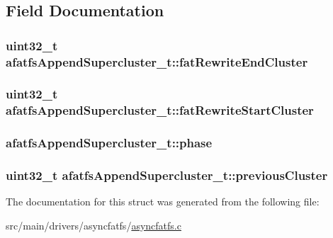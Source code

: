 \subsection{Field Documentation}
\hypertarget{structafatfsAppendSupercluster__t_ac1edbdf37acffd91580481e3715c75f9}{
\subsubsection[{fat\+Rewrite\+End\+Cluster}]{\setlength{\rightskip}{0pt plus 5cm}uint32\+\_\+t afatfs\+Append\+Supercluster\+\_\+t\+::fat\+Rewrite\+End\+Cluster}}\label{structafatfsAppendSupercluster__t_ac1edbdf37acffd91580481e3715c75f9}
\hypertarget{structafatfsAppendSupercluster__t_a8c086886ff7147eaa7f0555e5c7a20fc}{
\subsubsection[{fat\+Rewrite\+Start\+Cluster}]{\setlength{\rightskip}{0pt plus 5cm}uint32\+\_\+t afatfs\+Append\+Supercluster\+\_\+t\+::fat\+Rewrite\+Start\+Cluster}}\label{structafatfsAppendSupercluster__t_a8c086886ff7147eaa7f0555e5c7a20fc}
\hypertarget{structafatfsAppendSupercluster__t_af9cbd3193b72f73cf18571c3d9ba64aa}{
\subsubsection[{phase}]{ afatfs\+Append\+Supercluster\+\_\+t\+::phase}}\label{structafatfsAppendSupercluster__t_af9cbd3193b72f73cf18571c3d9ba64aa}
\hypertarget{structafatfsAppendSupercluster__t_a519f8bdd7c70b71003fbed1a68066e21}{
\subsubsection[{previous\+Cluster}]{\setlength{\rightskip}{0pt plus 5cm}uint32\+\_\+t afatfs\+Append\+Supercluster\+\_\+t\+::previous\+Cluster}}\label{structafatfsAppendSupercluster__t_a519f8bdd7c70b71003fbed1a68066e21}


The documentation for this struct was generated from the following file\+:\begin{DoxyCompactItemize}
\item 
src/main/drivers/asyncfatfs/\hyperlink{asyncfatfs_8c}{asyncfatfs.\+c}\end{DoxyCompactItemize}
